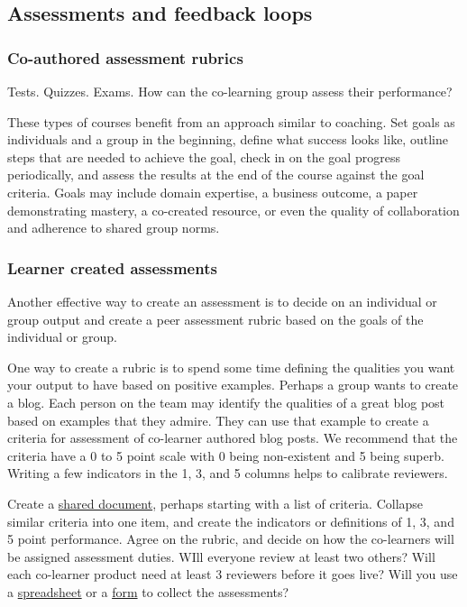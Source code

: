 \subsection{Assessments and feedback
loops}\label{assessments-and-feedback-loops}

\subsubsection{Co-authored assessment
rubrics}\label{co-authored-assessment-rubrics}

Tests. Quizzes. Exams. How can the co-learning group assess their
performance?

These types of courses benefit from an approach similar to coaching. Set
goals as individuals and a group in the beginning, define what success
looks like, outline steps that are needed to achieve the goal, check in
on the goal progress periodically, and assess the results at the end of
the course against the goal criteria. Goals may include domain
expertise, a business outcome, a paper demonstrating mastery, a
co-created resource, or even the quality of collaboration and adherence
to shared group norms.

\subsubsection{Learner created
assessments}\label{learner-created-assessments}

Another effective way to create an assessment is to decide on an
individual or group output and create a peer assessment rubric based on
the goals of the individual or group.

One way to create a rubric is to spend some time defining the qualities
you want your output to have based on positive examples. Perhaps a group
wants to create a blog. Each person on the team may identify the
qualities of a great blog post based on examples that they admire. They
can use that example to create a criteria for assessment of co-learner
authored blog posts. We recommend that the criteria have a 0 to 5 point
scale with 0 being non-existent and 5 being superb. Writing a few
indicators in the 1, 3, and 5 columns helps to calibrate reviewers.

Create a
\href{https://support.google.com/drive/bin/answer.py?hl=en\&answer=143213\&topic=21010\&ctx=topic}{shared
document}, perhaps starting with a list of criteria. Collapse similar
criteria into one item, and create the indicators or definitions of 1,
3, and 5 point performance. Agree on the rubric, and decide on how the
co-learners will be assigned assessment duties. WIll everyone review at
least two others? Will each co-learner product need at least 3 reviewers
before it goes live? Will you use a
\href{https://support.google.com/drive/bin/answer.py?hl=en\&answer=141195\&topic=20329\&ctx=topic}{spreadsheet}
or a
\href{http://support.google.com/drive/bin/answer.py?hl=en\&answer=87809}{form}
to collect the assessments?

